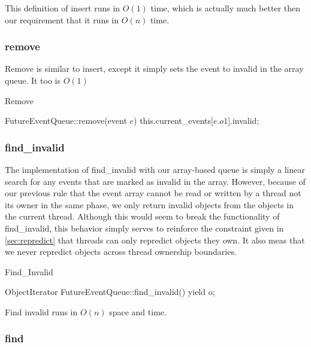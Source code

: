 \documentclass[conference]{IEEEtran}
\begin{document}
This definition of insert runs in $O(1)$ time, which is actually much better then our requirement that it runs in $O(n)$ time.

\subsubsection{remove}

Remove is similar to insert, except it simply sets the event to invalid in the array queue.  It too is $O(1)$

\begin{algorithm}
\caption{Remove}
\begin{algorithmic}
\STATE FutureEventQueue::remove(event $e$)
\STATE this.current\_events[$e.o1$].invalid;
\end{algorithmic}
\end{algorithm}

\subsubsection{find\_invalid}

The implementation of find\_invalid with our array-based queue is simply a linear search for any events that are marked as invalid in the array.
However, because of our previous rule that the event array cannot be read or written by a thread not its owner in the same phase, we only return invalid
objects from the objects in the current thread.  Although this would seem to break the functionality of find\_invalid, this behavior simply serves to reinforce
the constraint given in \ref{sec:repredict} that threads can only repredict objects they own. It also meas that we never repredict objects across thread
ownership boundaries.
\begin{algorithm}
\caption{Find\_Invalid}
\begin{algorithmic}
\STATE ObjectIterator FutureEventQueue::find\_invalid()
		\STATE {}
		\STATE yield o;
	\ENDIF
\ENDFOR
\end{algorithmic}
\end{algorithm}

Find invalid runs in $O(n)$ space and time.

\subsubsection{find}
\end{document}
